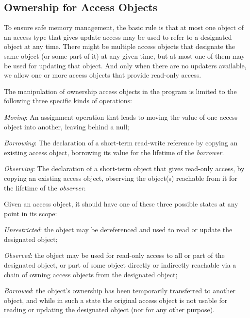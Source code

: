 \documentclass{llncs}
\begin{document}
\subsection{Ownership for Access Objects}
\label{subsec:ownershipAccess}

To ensure safe memory management, the basic rule is that at most one object of an access type that gives update access may be used to refer to a designated object at any time.  There might be multiple access objects that designate the same object (or some part of it) at any given time, but at most one of them may be used for updating that object.  And only when there are no updaters available, we allow one or more access objects that provide read-only access.


The manipulation of ownership access objects in the program is limited to the following three specific kinds of operations:

\begin{compactitem}
  \item \textit{Moving}: An assignment operation that leads to moving the value of one access object into another, leaving behind a null;
  \item \textit{Borrowing}: The declaration of a short-term read-write reference by copying an existing access object, borrowing its value for the lifetime of the \textit{borrower}.
  \item \textit{Observing}: The declaration of a short-term object that gives read-only access, by copying an existing access object, observing the object(s) reachable from it for the lifetime of the \textit{observer}.
\end{compactitem}

Given an access object, it should have one of these three possible states at any point in its scope:

\begin{compactitem}
  \item \textit {Unrestricted}: the object may be dereferenced and used to read or update the designated object;
  \item \textit {Observed}: the object may be used for read-only access to all or part of the designated object, or part of some object directly or indirectly reachable via a chain of owning access objects from the designated object;
  \item \textit {Borrowed}: the object's ownership has been temporarily transferred to another object,  and while in such a state the original access object is not usable for reading or updating the designated object (nor for any other purpose).
\end{compactitem}
\end{document}
